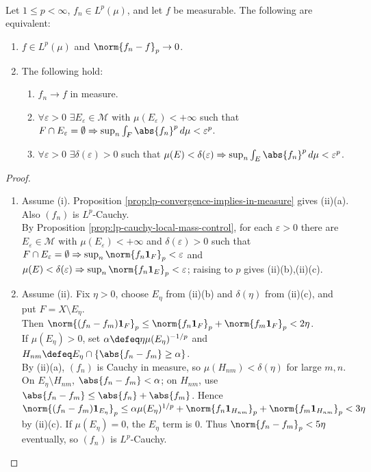 \begin{theorem} \label{thm:vitali-convergence-lp} \\
Let $1\leq p<\infty$, $f_n\in L^p(\mu)$, and let $f$ be measurable. The following are equivalent:
\begin{enumerate}[label=(\roman*)]
\setlength{\itemsep}{0pt}
\item $f\in L^p(\mu)$ and $\norm{f_n-f}_p\to0$.
\item The following hold:
\begin{enumerate}[label=(\alph*)]
\setlength{\itemsep}{0pt}
\item $f_n\to f$ in measure.
\item $\forall\varepsilon>0$ $\exists E_\varepsilon\in\mathcal{M}$ with $\mu(E_\varepsilon)<+\infty$ such that $F\cap E_\varepsilon=\emptyset\Rightarrow\sup_n\int_F\abs{f_n}^p\,d\mu<\varepsilon^p$.
\item $\forall\varepsilon>0$ $\exists\delta(\varepsilon)>0$ such that $\mu(E)<\delta(\varepsilon)\Rightarrow\sup_n\int_E\abs{f_n}^p\,d\mu<\varepsilon^p$.
\end{enumerate}
\end{enumerate}
\begin{proof}
\begin{enumerate}[label=(\roman*)]
\setlength{\itemsep}{0pt}
\item Assume (i). Proposition \ref{prop:lp-convergence-implies-in-measure} gives (ii)(a). Also $(f_n)$ is $L^p$-Cauchy.\\
By Proposition \ref{prop:lp-cauchy-local-mass-control}, for each $\varepsilon>0$ there are $E_\varepsilon\in\mathcal M$ with $\mu(E_\varepsilon)<+\infty$ and $\delta(\varepsilon)>0$ such that $F\cap E_\varepsilon=\emptyset\Rightarrow\sup_n\norm{f_n\mathbf{1}_F}_p<\varepsilon$ and $\mu(E)<\delta(\varepsilon)\Rightarrow\sup_n\norm{f_n\mathbf{1}_E}_p<\varepsilon$; raising to $p$ gives (ii)(b),(ii)(c).
\item Assume (ii). Fix $\eta>0$, choose $E_\eta$ from (ii)(b) and $\delta(\eta)$ from (ii)(c), and put $F=X\setminus E_\eta$.\\
Then $\norm{(f_n-f_m)\mathbf{1}_F}_p\leq\norm{f_n\mathbf{1}_F}_p+\norm{f_m\mathbf{1}_F}_p<2\eta$.\\
If $\mu(E_\eta)>0$, set $\alpha\defeq\eta\mu(E_\eta)^{-1/p}$ and $H_{nm}\defeq E_\eta\cap\{\abs{f_n-f_m}\geq\alpha\}$.\\
By (ii)(a), $(f_n)$ is Cauchy in measure, so $\mu(H_{nm})<\delta(\eta)$ for large $m,n$. On $E_\eta\setminus H_{nm}$, $\abs{f_n-f_m}<\alpha$; on $H_{nm}$, use $\abs{f_n-f_m}\leq\abs{f_n}+\abs{f_m}$. Hence $\norm{(f_n-f_m)\mathbf{1}_{E_\eta}}_p\leq\alpha\mu(E_\eta)^{1/p}+\norm{f_n\mathbf{1}_{H_{nm}}}_p+\norm{f_m\mathbf{1}_{H_{nm}}}_p<3\eta$ by (ii)(c). If $\mu(E_\eta)=0$, the $E_\eta$ term is $0$. Thus $\norm{f_n-f_m}_p<5\eta$ eventually, so $(f_n)$ is $L^p$-Cauchy.\\

\end{enumerate}
\end{proof}
\end{theorem}
